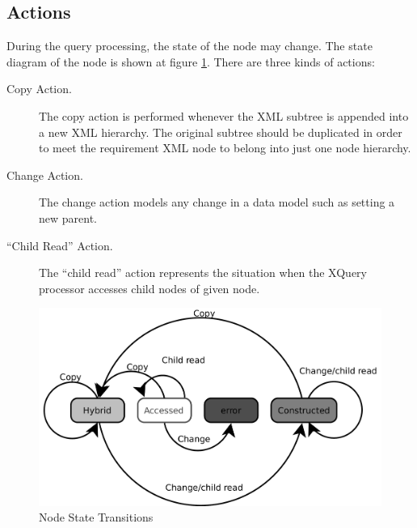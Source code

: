 \documentclass{llncs}
\begin{document}
\subsection{Actions}

During the query processing, the state of the node may change. 
The state diagram of the node is shown at figure \ref{fig:kinds_transitions}.
There are three kinds of actions: 

\begin{description}
  \item[Copy Action.] 
    The copy action is performed whenever the XML subtree is appended into 
    a new XML hierarchy. The original subtree should be duplicated in order
    to meet the requirement XML node to belong into just one node hierarchy.


  \item[Change Action.]
    The change action models any change in a data model such as setting a 
    new parent.


  \item[``Child Read'' Action.]
    The ``child read'' action represents the situation when
    the XQuery processor accesses child nodes of given node.

\end{description}
%    
    
\begin{figure}[ht]
  \centering
  \includegraphics[scale=0.25]{hybrid_kinds_transitions}
  \caption{Node State Transitions}
  \label{fig:kinds_transitions}
\end{figure}
\end{document}
